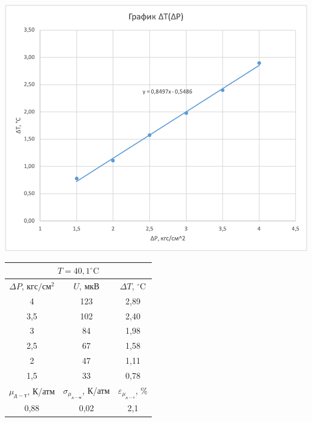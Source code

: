 \documentclass[a4paper, 12pt]{article}
\begin{document}
\begin{table}[pt]
        \vspace{0.5cm}
        
        \begin{minipage}[ht]{0.55\linewidth}
            \includegraphics[width=\linewidth]{images/ch5.png}
        \end{minipage}
        \hfill
        \begin{minipage}[ht]{0.47\linewidth}
            \begin{tabular}{|c|c|c|}
                \hline
                \multicolumn{3}{|c|}{$T = 40,1^{\circ}\text{C}$} \\
                \hline
                $\Delta P$, $кгс/см^2$ & $U$, $мкВ$ & $\Delta T$, $^{\circ}\text{C}$ \\
                \hline
                4 & 123 & 2,89 \\
                \hline
                3,5 & 102 & 2,40 \\
                \hline
                3 & 84 & 1,98 \\
                \hline
                2,5 & 67 & 1,58 \\
                \hline
                2 & 47 & 1,11 \\
                \hline
                1,5 & 33 & 0,78 \\
                \hline
                $\mu_{д-т}$, К/атм & $\sigma_{\mu_{д-м}}$, К/атм & $\varepsilon_{\mu_{д-т}}$, \% \\
                \hline
                0,88 & 0,02 & 2,1 \\
                \hline
            \end{tabular}
        \end{minipage}
        

\end{table}
\end{document}
